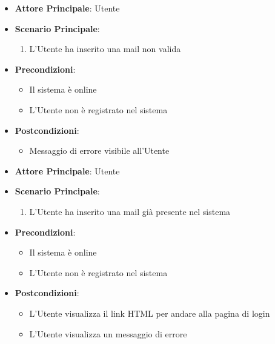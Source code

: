 \begin{itemize} 
    \item \textbf{Attore Principale}: Utente
    \item \textbf{Scenario Principale}:
    \begin{enumerate}
        \item L'Utente ha inserito una mail non valida
    \end{enumerate}
    \item \textbf{Precondizioni}:
    \begin{itemize}
        \item Il sistema è online
        \item L'Utente non è registrato nel sistema
    \end{itemize}
    \item \textbf{Postcondizioni}:
    \begin{itemize}
        \item Messaggio di errore visibile all'Utente 
    \end{itemize}
\end{itemize}


\label{uc_01.4.2}

\begin{itemize}
    \item \textbf{Attore Principale}: Utente
    \item \textbf{Scenario Principale}:
    \begin{enumerate}
        \item L'Utente ha inserito una mail già presente nel sistema
    \end{enumerate}
    \item \textbf{Precondizioni}:
    \begin{itemize}
        \item Il sistema è online
        \item L'Utente non è registrato nel sistema
    \end{itemize}
    \item \textbf{Postcondizioni}:
    \begin{itemize}
        \item L'Utente visualizza il link HTML per andare alla pagina di login
        \item L'Utente visualizza un messaggio di errore
    \end{itemize}
\end{itemize}